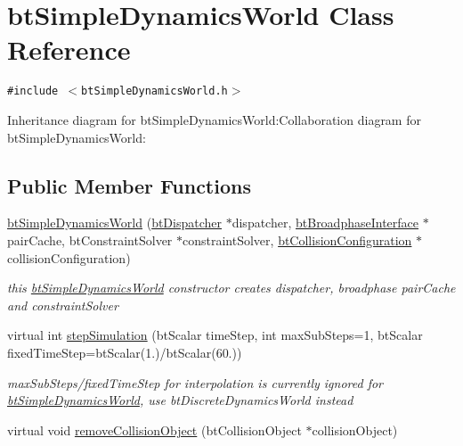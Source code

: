 \hypertarget{classbt_simple_dynamics_world}{
\section{btSimpleDynamicsWorld Class Reference}
\label{classbt_simple_dynamics_world}
}
{\tt \#include $<$btSimpleDynamicsWorld.h$>$}

Inheritance diagram for btSimpleDynamicsWorld:Collaboration diagram for btSimpleDynamicsWorld:\subsection*{Public Member Functions}
\begin{CompactItemize}
\item 
\hypertarget{classbt_simple_dynamics_world_7a82e6d27693ee39d4d2cdf44788ecc8}{
\hyperlink{classbt_simple_dynamics_world_7a82e6d27693ee39d4d2cdf44788ecc8}{btSimpleDynamicsWorld} (\hyperlink{classbt_dispatcher}{btDispatcher} $\ast$dispatcher, \hyperlink{classbt_broadphase_interface}{btBroadphaseInterface} $\ast$pairCache, btConstraintSolver $\ast$constraintSolver, \hyperlink{classbt_collision_configuration}{btCollisionConfiguration} $\ast$collisionConfiguration)}
\label{classbt_simple_dynamics_world_7a82e6d27693ee39d4d2cdf44788ecc8}

\begin{CompactList}\small\item\em this \hyperlink{classbt_simple_dynamics_world}{btSimpleDynamicsWorld} constructor creates dispatcher, broadphase pairCache and constraintSolver \item\end{CompactList}\item 
virtual int \hyperlink{classbt_simple_dynamics_world_f6b4810b5018cbaf09f82839111a243d}{stepSimulation} (btScalar timeStep, int maxSubSteps=1, btScalar fixedTimeStep=btScalar(1.)/btScalar(60.))
\begin{CompactList}\small\item\em maxSubSteps/fixedTimeStep for interpolation is currently ignored for \hyperlink{classbt_simple_dynamics_world}{btSimpleDynamicsWorld}, use btDiscreteDynamicsWorld instead \item\end{CompactList}\item 
\hypertarget{classbt_simple_dynamics_world_7c9255653135c9117d6a27738a3077ab}{
virtual void \hyperlink{classbt_simple_dynamics_world_7c9255653135c9117d6a27738a3077ab}{removeCollisionObject} (btCollisionObject $\ast$collisionObject)}
\label{classbt_simple_dynamics_world_7c9255653135c9117d6a27738a3077ab}


\end{CompactItemize}
